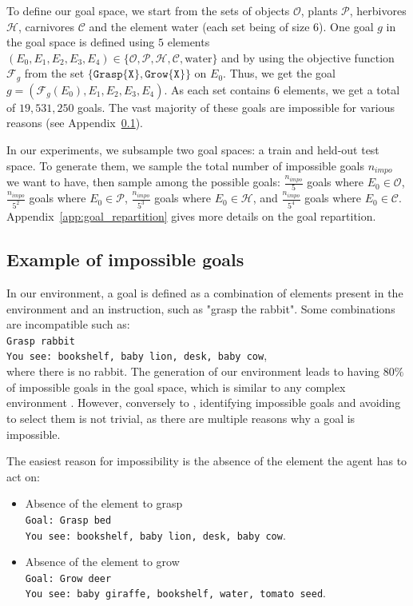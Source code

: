 To define our goal space, we start from the sets of objects $\mathcal{O}$, plants $\mathcal{P}$, herbivores $\mathcal{H}$, carnivores $\mathcal{C}$ and the element water (each set being of size $6$). One goal $g$ in the goal space is defined using $5$ elements $(E_0, E_1, E_2, E_3, E_4) \in \{ \mathcal{O}, \mathcal{P}, \mathcal{H}, \mathcal{C}, \text{water} \}$ and by using the objective function $\mathcal{F}_{g}$ from the set $\{\texttt{Grasp\{X\}}, \texttt{Grow\{X\}}\}$ on $E_0$. Thus, we get the goal $g=(\mathcal{F}_{g}(E_0), E_1, E_2, E_3, E_4)$. As each set contains $6$ elements, we get a total of $19,531,250$ goals. The vast majority of these goals are impossible for various reasons (see Appendix~\ref{app:example_of_impossible_goals}).

In our experiments, we subsample two goal spaces: a train and held-out test space. To generate them, we sample the total number of impossible goals $n_{impo}$ we want to have, then sample among the possible goals: $\frac{n_{impo}}{5}$ goals where $E_0 \in \mathcal{O}$, $\frac{n_{impo}}{5^2}$ goals where $E_0 \in \mathcal{P}$, $\frac{n_{impo}}{5^3}$ goals where $E_0 \in \mathcal{H}$, and $\frac{n_{impo}}{5^4}$ goals where $E_0 \in \mathcal{C}$. Appendix~\ref{app:goal_repartition} gives more details on the goal repartition.

\subsection{Example of impossible goals}
\label{app:example_of_impossible_goals}

In our environment, a goal is defined as a combination of elements present in the environment and an instruction, such as "grasp the rabbit". Some combinations are incompatible such as:\\ \texttt{Grasp rabbit \\ You see: bookshelf, baby lion, desk, baby cow}, \\
where there is no rabbit. The generation of our environment leads to having $80\%$ of impossible goals in the goal space, which is similar to any complex environment \cite{zhang_omni_2024, matthews2024kinetixinvestigatingtraininggeneral}. However, conversely to \cite{zhang_omni_2024}, identifying impossible goals and avoiding to select them is not trivial, as there are multiple reasons why a goal is impossible.

The easiest reason for impossibility is the absence of the element the agent has to act on:
\begin{itemize}
    \item Absence of the element to grasp \\
\texttt{Goal: Grasp bed \\
You see: bookshelf, baby lion, desk, baby cow}.
\item Absence of the element to grow \\
\texttt{Goal: Grow deer \\
You see: baby giraffe, bookshelf, water, tomato seed}.
\end{itemize}

